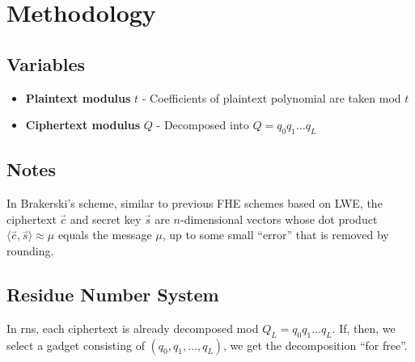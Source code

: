 \chapter{Methodology}
\label{chp:methodology}

\section{Variables}
\begin{itemize}
    \item \textbf{Plaintext modulus} $t$ - Coefficients of plaintext polynomial are taken mod ${t}$
    \item \textbf{Ciphertext modulus} $Q$ - Decomposed into $Q=q_0q_1\dots q_L$
\end{itemize}

\section{Notes}
In Brakerski's scheme, similar to previous FHE schemes based on LWE, the ciphertext $\overset{_\rightarrow}{c}$ and secret key $\overset{_\rightarrow}{s}$ are $n$-dimensional vectors whose dot product $\langle \overset{_\rightarrow}{c}, \overset{_\rightarrow}{s}\rangle \approx \mu$ equals the message $\mu$, up to some small ``error'' that is removed by rounding.

\section{Residue Number System}
In \gls{rns}, each ciphertext is already decomposed mod $Q_L = q_0q_1\dots q_L$. If, then, we select a gadget consisting of $(q_0, q_1, \dots, q_L)$, we get the decomposition ``for free''.

